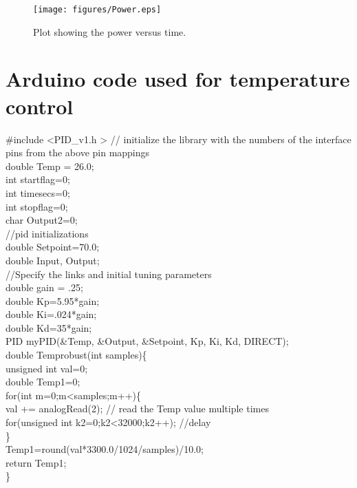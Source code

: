 \begin{figure}
	\centering
	\texttt{[image: figures/Power.eps]}
	\caption{\label{fig:Powresp} Plot showing the power versus time.}
\end{figure}


\section{Arduino code used for temperature control}

\noindent \#include \textless PID\_v1.h \textgreater
// initialize the library with the numbers of the interface pins from the above pin mappings\\
double Temp = 26.0;\\
int startflag=0;\\
int timesecs=0;\\
int stopflag=0;\\
char Output2=0;\\
//pid initializations\\
double Setpoint=70.0;\\
double Input, Output;\\
//Specify the links and initial tuning parameters\\
double gain = .25;\\
double Kp=5.95*gain;\\
double Ki=.024*gain;\\
double Kd=35*gain;\\
PID myPID(\&Temp, \&Output, \&Setpoint, Kp, Ki, Kd, DIRECT);\\
double Temprobust(int samples)\{\\
	unsigned int val=0;\\
	double Temp1=0;\\
	for(int m=0;m<samples;m++)\{\\
		val += analogRead(2); // read the Temp value multiple times\\
		for(unsigned int k2=0;k2\textless 32000;k2++); //delay\\
	\}\\
	Temp1=round(val*3300.0/1024/samples)/10.0;\\
	return Temp1;\\
\}\\


